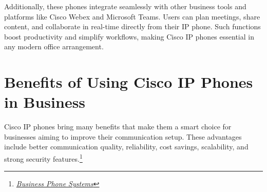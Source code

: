 \documentclass[11pt,a4paper]{article}
\begin{document}
Additionally, these phones integrate seamlessly with other business tools and platforms like Cisco Webex and Microsoft Teams. Users can plan meetings, share content, and collaborate in real-time directly from their IP phone. Such functions boost productivity and simplify workflows, making Cisco IP phones essential in any modern office arrangement.


\section*{Benefits of Using Cisco IP Phones in Business}

Cisco IP phones bring many benefits that make them a smart choice for businesses aiming to improve their communication setup. These advantages include better communication quality, reliability, cost savings, scalability, and strong security features.\footnote{\href{https://www.cisco.com/c/en/us/solutions/small-business/collaboration/phone-systems.html}{\textit{Business Phone Systems}}}
\end{document}
